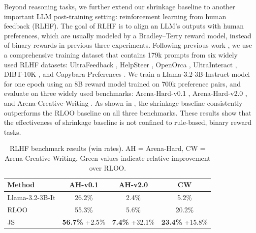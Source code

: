 \documentclass{article}
\theoremstyle{plain}
\theoremstyle{definition}
\theoremstyle{remark}
\begin{document}
  Beyond reasoning tasks, we further extend our shrinkage baseline to another important LLM post-training setting: reinforcement learning from human feedback (RLHF). The goal of RLHF is to align an LLM's outputs with human preferences, which are usually modeled by a Bradley–Terry reward model, instead of binary rewards in previous three experiments. Following previous work \citep{hu2025reinforce++,tiapkin2025accelerating,zhang2025onpo,leng2024taming}, we use a comprehensive training dataset \citep{dong2024rlhfworkflow} that contains 179k prompts from six widely used RLHF datasets: UltraFeedback \citep{cui2024ultrafeedback}, HelpSteer \citep{wang2024helpsteer}, OpenOrca \citep{openorca2023}, UltraInteract \citep{yuan2025ultrainteract}, DIBT-10K \citep{dibt2024_10k_prompts_ranked}, and Capybara Preferences \citep{capybara_preferences_2024}. We train a Llama-3.2-3B-Instruct model \citep{grattafiori2024llama} for one epoch using an 8B reward model \citep{openrlhf_llama3_8b_rm_700k} trained on 700k preference pairs, and evaluate on three widely used benchmarks: Arena-Hard-v0.1 \citep{li2024crowdsourced_v2}, Arena-Hard-v2.0 \citep{li2024crowdsourced_v2}, and Arena-Creative-Writing \citep{li2024crowdsourced_v2}. As shown in , the shrinkage baseline consistently outperforms the RLOO baseline on all three benchmarks. These results show that the effectiveness of shrinkage baseline is not confined to rule-based, binary reward tasks.

\begin{table}[htbp]
  \caption{RLHF benchmark results (win rates). AH = Arena-Hard, CW = Arena-Creative-Writing. Green values indicate relative improvement over RLOO.}
  \small
  \label{tab:arena-results}
  \centering
  \begin{tabular}{lccc}
    \toprule
    \textbf{Method} & \textbf{AH-v0.1} & \textbf{AH-v2.0} & \textbf{CW} \\
    \midrule
    Llama-3.2-3B-It & 26.2\% &  2.4\% &  5.2\% \\
    RLOO            & 55.3\% &  5.6\% & 20.2\% \\
    JS              & \textbf{56.7\%} {\scriptsize\textcolor[rgb]{0,0.5,0}{+2.5\%}} &
                      \textbf{7.4\%} {\scriptsize\textcolor[rgb]{0,0.5,0}{+32.1\%}} &
                      \textbf{23.4\%} {\scriptsize\textcolor[rgb]{0,0.5,0}{+15.8\%}} \\
    \bottomrule
  \end{tabular}
\end{table}
\end{document}
